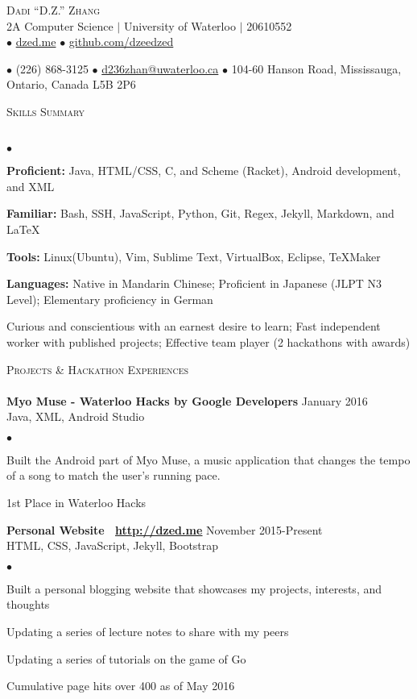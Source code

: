 \documentclass{article}
\newcommand{\lineunder}{\vspace*{-8pt} \\ \hspace*{-18pt} \hrulefill \\}
\newcommand{\header}[1]{{\hspace*{-15pt}\vspace*{6pt} \textsc{#1}} \vspace*{-6pt} \lineunder}
\newcommand{\employer}[3]{{ \textbf{#1} \hfill #2\\ {#3}\\  }}
\newcommand{\contact}[3]{
\begin{center}
{}
\end{center}
\vspace*{-8pt}
\begin{center}
{\LARGE \scshape {#1}}\\
#2\\
#3
\end{center}
\vspace*{-8pt}
}
\newenvironment{achievements}{\begin{list}{$\bullet$}{\topsep 0pt \itemsep -2pt}}{\vspace*{4pt}\end{list}}
\begin{document}
\small
\smallskip
\vspace*{-44pt}

\contact{Dadi ``D.Z.'' Zhang}
{2A Computer Science $\vert$ University of Waterloo $\vert$ 20610552}
{$\bullet$ \href{http://dzed.me}{dzed.me}
$\bullet$ \href{http://github.com/dzeedzed}{github.com/dzeedzed}}
{$\bullet$ (226) 868-3125
$\bullet$ \href{mailto:d236zhan@uwaterloo.ca}{d236zhan@uwaterloo.ca}
$\bullet$ 104-60 Hanson Road, Mississauga, Ontario, Canada L5B 2P6}

\hfill \break
\header{Skills Summary}
\begin{achievements}
\item \textbf{Proficient:} Java, HTML/CSS, C, and Scheme (Racket), Android development, and XML
\item \textbf{Familiar:} Bash, SSH, JavaScript, Python, Git, Regex, Jekyll, Markdown, and  \LaTeX\
\item \textbf{Tools:} Linux(Ubuntu), Vim, Sublime Text, VirtualBox, Eclipse, TeXMaker
\item \textbf{Languages:} Native in Mandarin Chinese; Proficient in Japanese (JLPT N3 Level); Elementary proficiency in German
\item Curious and conscientious with an earnest desire to learn; Fast independent worker with published projects; Effective team player (2 hackathons with awards)
\end{achievements}

\header{Projects \& Hackathon Experiences}

\employer{Myo Muse - Waterloo Hacks by Google Developers}{January 2016}{Java, XML, Android Studio}
	\begin{achievements}
	\item Built the Android part of Myo Muse, a music application that changes the tempo of a song to match the user's running pace.
	\item 1st Place in Waterloo Hacks
	\end{achievements}
	
\employer{Personal Website \hspace{5pt} \Mundus~\href{http://dzed.me}{\underline{http://dzed.me}}}{November 2015-Present}{HTML, CSS, JavaScript, Jekyll, Bootstrap}
	\begin{achievements}
	\item Built a personal blogging website that showcases my projects, interests, and thoughts
	\item Updating a series of lecture notes to share with my peers
	\item Updating a series of tutorials on the game of Go
	\item Cumulative page hits over 400 as of May 2016
	\end{achievements}
	
\end{document}
